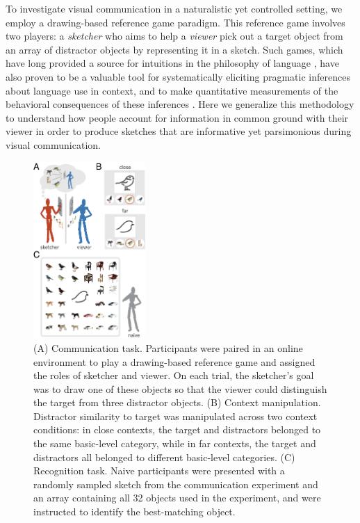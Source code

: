 \documentclass[9pt,twocolumn,twoside]{pnas-new}
\begin{document}
To investigate visual communication in a naturalistic yet controlled setting, we employ a drawing-based reference game paradigm.
This reference game involves two players: a \textit{sketcher} who aims to help a \textit{viewer} pick out a target object from an array of distractor objects by representing it in a sketch. 
Such games, which have long provided a source for intuitions in the philosophy of language \citep{wittgenstein1953philosophical,Lewis69_Convention}, have also proven to be a valuable tool for systematically eliciting pragmatic inferences about language use in context, and to make quantitative measurements of the behavioral consequences of these inferences \cite{goodman2016pragmatic,kao2014formalizing,goodman2013knowledge,frank2012predicting}. 
Here we generalize this methodology to understand how people account for information in common ground with their viewer in order to produce sketches that are informative \cite{grice1975syntax,wilson1986relevance} yet parsimonious \cite{zipf1936psycho} during visual communication.
\begin{figure}[htbp]
\centering
\includegraphics[width=0.38\textwidth]{figures/1_task_display_alt.png}
\caption{(A) Communication task. Participants were paired in an online environment to play a drawing-based reference game and assigned the roles of sketcher and viewer. On each trial, the sketcher's goal was to draw one of these objects so that the viewer could distinguish the target from three distractor objects. (B) Context manipulation. Distractor similarity to target was manipulated across two context conditions: in close contexts, the target and distractors belonged to the same basic-level category, while in far contexts, the target and distractors all belonged to different basic-level categories. (C) Recognition task. Naive participants were presented with a randomly sampled sketch from the communication experiment and an array containing all 32 objects used in the experiment, and were instructed to identify the best-matching object.}
\label{task_display}
\end{figure}
\end{document}
